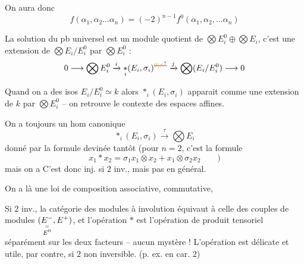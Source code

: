 On aura donc
\[
 f(\alpha_1,\alpha_2\ldots\alpha_n)=(-2)^{n-1}f^0(\alpha_1,\alpha_2,\ldots\alpha_n)
\]

La solution du pb  universel est un module quotient de $\bigotimes E_i^0\oplus\bigotimes E_i$, c'est une extension de $\bigotimes E_i/E_i^0$ par $\bigotimes E_i^0$ :
\[
0\longrightarrow\bigotimes E_i^0\xrightarrow{i}\mathop{*}_{i}(E_i,\sigma_i)^{\deleted{\unsure{0|\wedge}}}\xrightarrow{j}\bigotimes(E_i/E_i^0)\longrightarrow0
\]

Quand on a des isos $E_i/E_i^0\simeq k$ alors $\mathop{*}_{i}(E_i,\sigma_i)$ apparait comme une extension de $k$ par $\bigotimes E_i^0$ -- on retrouve le contexte des espaces affines.

On a toujours un hom canonique
\[
\mathop{*}_{i}(E_i,\sigma_i)\xrightarrow{\tau}\bigotimes E_i
\]
donné par la formule devinée tantôt (pour $n=2$, c'est la formule
\[
x_1*x_2=\sigma_1 x_1\otimes x_2+x_1\otimes\sigma_2 x_2\qquad)
\]
mais on a
C'est donc inj. si $2$ inv., mais pas en général.

On a là une loi de composition  associative, commutative,

Si $2$ inv., la catégorie des modules à involution équivaut à celle des  couples de modules $(\underset{\substack{\shortparallel\\ E^0}}{E^-},E^+)$, et l'opération $*$ est l'opération de produit tensoriel séparément sur les deux facteurs  -- aucun mystère ! L'opération est délicate et utile, par contre, si $2$ non inversible. (p. ex. en car. $2$)

